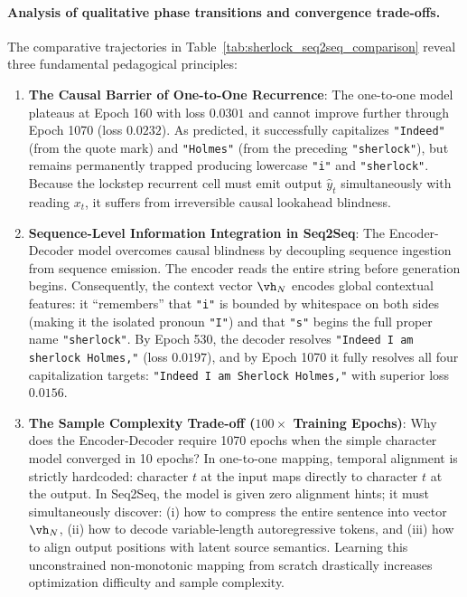 \documentclass[../../main.tex]{subfiles}
\begin{document}
\paragraph{Analysis of qualitative phase transitions and convergence trade-offs.}
The comparative trajectories in Table~\ref{tab:sherlock_seq2seq_comparison} reveal three fundamental pedagogical principles:
\begin{enumerate}
    \item \textbf{The Causal Barrier of One-to-One Recurrence}: The one-to-one model plateaus at Epoch 160 with loss $0.0301$ and cannot improve further through Epoch 1070 (loss $0.0232$). As predicted, it successfully capitalizes \texttt{"Indeed"} (from the quote mark) and \texttt{"Holmes"} (from the preceding \texttt{"sherlock"}), but remains permanently trapped producing lowercase \texttt{"i"} and \texttt{"sherlock"}. Because the lockstep recurrent cell must emit output $\hat{y}_t$ simultaneously with reading $x_t$, it suffers from irreversible causal lookahead blindness.
    \item \textbf{Sequence-Level Information Integration in Seq2Seq}: The Encoder-Decoder model overcomes causal blindness by decoupling sequence ingestion from sequence emission. The encoder reads the entire string before generation begins. Consequently, the context vector $\vh_N$ encodes global contextual features: it ``remembers'' that \texttt{"i"} is bounded by whitespace on both sides (making it the isolated pronoun \texttt{"I"}) and that \texttt{"s"} begins the full proper name \texttt{"sherlock"}. By Epoch 530, the decoder resolves \texttt{"Indeed I am sherlock Holmes,"} (loss $0.0197$), and by Epoch 1070 it fully resolves all four capitalization targets: \texttt{"Indeed I am Sherlock Holmes,"} with superior loss $0.0156$.
    \item \textbf{The Sample Complexity Trade-off ($100\times$ Training Epochs)}: Why does the Encoder-Decoder require 1070 epochs when the simple character model converged in 10 epochs? In one-to-one mapping, temporal alignment is strictly hardcoded: character $t$ at the input maps directly to character $t$ at the output. In Seq2Seq, the model is given zero alignment hints; it must simultaneously discover: (i) how to compress the entire sentence into vector $\vh_N$, (ii) how to decode variable-length autoregressive tokens, and (iii) how to align output positions with latent source semantics. Learning this unconstrained non-monotonic mapping from scratch drastically increases optimization difficulty and sample complexity.
\end{enumerate}
\end{document}
